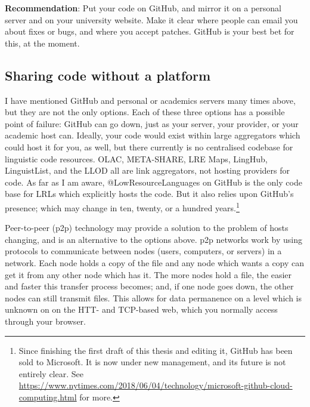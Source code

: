 \textbf{Recommendation}: Put your code on GitHub, and mirror it on a personal server and on your university website. Make it clear where people can email you about fixes or bugs, and where you accept patches. GitHub is your best bet for this, at the moment.

\subsection{Sharing code without a platform}
\label{subsec:sharing-code-without-a-platform}


I have mentioned GitHub and personal or academics servers many times above, but they are not the only options. Each of these three options has a possible point of failure: GitHub can go down, just as your server, your provider, or your academic host can. Ideally, your code would exist within large aggregators which could host it for you, as well, but there currently is no centralised codebase for linguistic code resources. OLAC, META-SHARE, LRE Maps, LingHub, LinguistList, and the LLOD all are link aggregators, not hosting providers for code. As far as I am aware, @LowResourceLanguages on GitHub is the only code base for LRLs which explicitly hosts the code. But it also relies upon GitHub's presence; which may change in ten, twenty, or a hundred years.\footnote{Since finishing the first draft of this thesis and editing it, GitHub has been sold to Microsoft. It is now under new management, and its future is not entirely clear. See \href{https://www.nytimes.com/2018/06/04/technology/microsoft-github-cloud-computing.html}{https://www.nytimes.com/2018/06/04/technology/microsoft-github-cloud-computing.html} for more. }

Peer-to-peer (p2p) technology may provide a solution to the problem of hosts changing, and is an alternative to the options above. p2p networks work by using protocols to communicate between nodes (users, computers, or servers) in a network. Each node holds a copy of the file and any node which wants a copy can get it from any other node which has it. The more nodes hold a file, the easier and faster this transfer process becomes; and, if one node goes down, the other nodes can still transmit files. This allows for data permanence on a level which is unknown on on the HTT- and TCP-based web, which you normally access through your browser.

